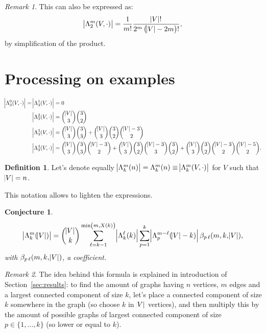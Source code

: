 \documentclass{article}
\newtheorem{conjecture}[lemma]{Conjecture}
\theoremstyle{definition}
\newtheorem{definition}[lemma]{Definition}
\theoremstyle{remark}
\newtheorem*{remark}{Remark}
\begin{document}
			\begin{remark} This can also be expressed as:
			\[\abs {\Lambda_2^m(V, \cdot)} = \frac 1{m!}\frac {\abs V!}{2^m\left(\abs V-2m\right)!},\]
			by simplification of the product.
			\end{remark}

\section{Processing on examples}
	\begin{align*}
		\abs {\Lambda_3^0(V, \cdot)} = \abs {\Lambda_3^1(V, \cdot)} &= 0 \\
		\abs {\Lambda_3^2(V, \cdot)} &= \binom {\abs V}3\binom 32 \\
		\abs {\Lambda_3^3(V, \cdot)} &= \binom {\abs V}3\binom 33 + \binom {\abs V}3\binom 32\binom {\abs V-3}2 \\
		\abs {\Lambda_3^4(V, \cdot)} &= \binom {\abs V}3\binom 33\binom {\abs V-3}2 + \binom {\abs V}3\binom 32\binom {\abs V-3}3\binom 32 + \binom {\abs V}3\binom 32\binom {\abs V-3}2\binom {\abs V-5}2.
	\end{align*}

	\begin{definition} Let's denote equally $\abs {\Lambda_k^m(n)} = \Lambda_k^m(n) \equiv \abs {\Lambda_k^m(V, \cdot)}$ for $V$ such that $\abs V = n$.
	\end{definition}

	This notation allows to lighten the expressions.

	\begin{conjecture}
	\[\abs {\Lambda_k^m(\abs V)}
		= \binom {\abs V}k\sum_{\ell=k-1}^{\min\left(m, X(k)\right)}\abs {\Lambda_k^\ell(k)}\sum_{p=1}^k\abs {\Lambda_p^{m-\ell}(\abs V-k)}\beta_{p\,\ell}(m, k, \abs V),\]
	with $\beta_{p\,\ell}(m, k, \abs V)$, a coefficient.
	\end{conjecture}

	\begin{remark} The idea behind this formula is explained in introduction of Section~\ref{sec:results}: to find the amount of graphs having $n$ vertices, $m$ edges
	and a largest connected component of size $k$, let's place a connected component of size $k$ somewhere in the graph (so choose $k$ in $\abs V$ vertices), and then multiply this
	by the amount of possible graphs of largest connected component of size $p \in \{1, \ldots, k\}$ (so lower or equal to $k$).
	\end{remark}
\end{document}
